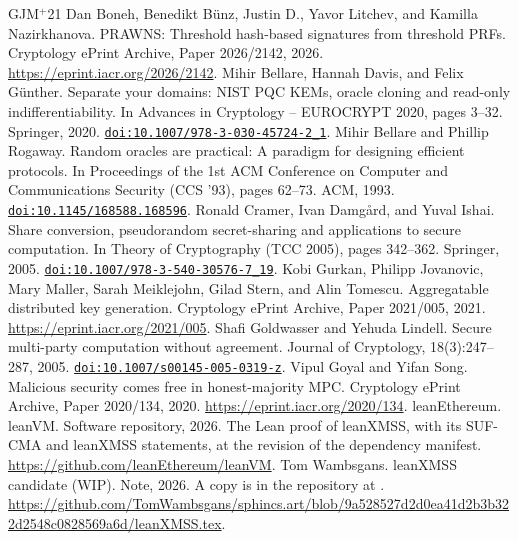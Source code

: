 \documentclass[11pt]{article}
\newcommand{\etalchar}[1]{$^{#1}$}
\newcommand{\doi}[1]{\href{https://doi.org/#1}{\nolinkurl{doi:#1}}}
\begin{document}
{\footnotesize
\begin{thebibliography}{GJM{\etalchar{+}}21}\itemsep0pt
\bibitem[BBD{\etalchar{+}}26]{BBD+26} Dan Boneh, Benedikt B\"unz, Justin D., Yavor Litchev, and Kamilla
Nazirkhanova. PRAWNS: Threshold hash-based signatures from threshold PRFs. Cryptology ePrint Archive,
Paper 2026/2142, 2026. \url{https://eprint.iacr.org/2026/2142}.
 Mihir Bellare, Hannah Davis, and Felix G\"unther. Separate your domains: NIST PQC
KEMs, oracle cloning and read-only indifferentiability. In Advances in Cryptology -- EUROCRYPT 2020,
pages 3--32. Springer, 2020. \doi{10.1007/978-3-030-45724-2_1}.
 Mihir Bellare and Phillip Rogaway. Random oracles are practical: A paradigm for
designing efficient protocols. In Proceedings of the 1st ACM Conference on Computer and Communications
Security (CCS '93), pages 62--73. ACM, 1993. \doi{10.1145/168588.168596}.
 Ronald Cramer, Ivan Damg\aa rd, and Yuval Ishai. Share conversion, pseudorandom
secret-sharing and applications to secure computation. In Theory of Cryptography (TCC 2005), pages
342--362. Springer, 2005. \doi{10.1007/978-3-540-30576-7_19}.
\bibitem[GJM{\etalchar{+}}21]{GJM+21} Kobi Gurkan, Philipp Jovanovic, Mary Maller, Sarah Meiklejohn,
Gilad Stern, and Alin Tomescu. Aggregatable distributed key generation. Cryptology ePrint Archive,
Paper 2021/005, 2021. \url{https://eprint.iacr.org/2021/005}.
 Shafi Goldwasser and Yehuda Lindell. Secure multi-party computation without
agreement. Journal of Cryptology, 18(3):247--287, 2005. \doi{10.1007/s00145-005-0319-z}.
 Vipul Goyal and Yifan Song. Malicious security comes free in honest-majority MPC.
Cryptology ePrint Archive, Paper 2020/134, 2020. \url{https://eprint.iacr.org/2020/134}.
 leanEthereum. leanVM. Software repository, 2026. The Lean proof of leanXMSS, with its
SUF-CMA and leanXMSS statements, at the revision of the dependency manifest.
\url{https://github.com/leanEthereum/leanVM}.
 Tom Wambsgans. leanXMSS candidate (WIP). Note, 2026. A copy is in the repository
at .
\url{https://github.com/TomWambsgans/sphincs.art/blob/9a528527d2d0ea41d2b3b322d2548c0828569a6d/leanXMSS.tex}.
\end{thebibliography}}
\end{document}

